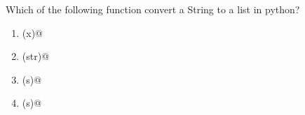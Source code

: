 \question
Which of the following function convert a String to a list in python?

\begin{enumerate}
\item \lstinline@repr(x)@
\item \lstinline@eval(str)@
\item \lstinline@tuple(s)@
\item \lstinline@list(s)@
\end{enumerate}

